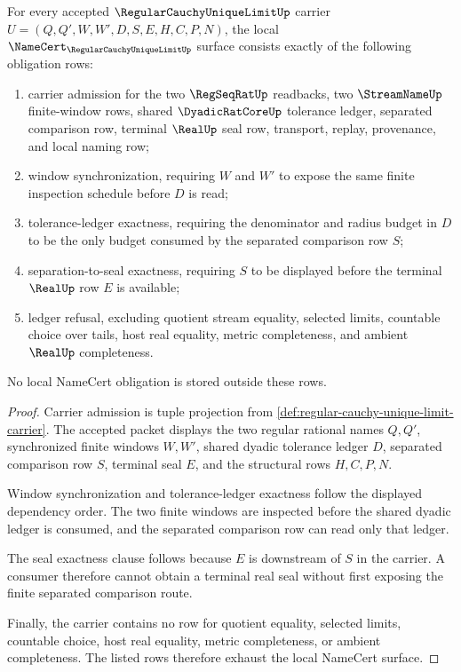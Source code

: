 \begin{theorem}
\label{thm:regular-cauchy-unique-limit-namecert-obligations}
For every accepted $\RegularCauchyUniqueLimitUp$ carrier $U=(Q,Q',W,W',D,S,E,H,C,P,N)$, the local $\NameCert_{\RegularCauchyUniqueLimitUp}$ surface consists exactly of the following obligation rows:
\begin{enumerate}
\item carrier admission for the two $\RegSeqRatUp$ readbacks, two $\StreamNameUp$ finite-window rows, shared $\DyadicRatCoreUp$ tolerance ledger, separated comparison row, terminal $\RealUp$ seal row, transport, replay, provenance, and local naming row;
\item window synchronization, requiring $W$ and $W'$ to expose the same finite inspection schedule before $D$ is read;
\item tolerance-ledger exactness, requiring the denominator and radius budget in $D$ to be the only budget consumed by the separated comparison row $S$;
\item separation-to-seal exactness, requiring $S$ to be displayed before the terminal $\RealUp$ row $E$ is available;
\item ledger refusal, excluding quotient stream equality, selected limits, countable choice over tails, host real equality, metric completeness, and ambient $\RealUp$ completeness.
\end{enumerate}
No local NameCert obligation is stored outside these rows.
\end{theorem}
\begin{proof}
Carrier admission is tuple projection from \autoref{def:regular-cauchy-unique-limit-carrier}. The accepted packet displays the two regular rational names $Q,Q'$, synchronized finite windows $W,W'$, shared dyadic tolerance ledger $D$, separated comparison row $S$, terminal seal $E$, and the structural rows $H,C,P,N$.

Window synchronization and tolerance-ledger exactness follow the displayed dependency order. The two finite windows are inspected before the shared dyadic ledger is consumed, and the separated comparison row can read only that ledger.

The seal exactness clause follows because $E$ is downstream of $S$ in the carrier. A consumer therefore cannot obtain a terminal real seal without first exposing the finite separated comparison route.

Finally, the carrier contains no row for quotient equality, selected limits, countable choice, host real equality, metric completeness, or ambient completeness. The listed rows therefore exhaust the local NameCert surface.
\end{proof}

